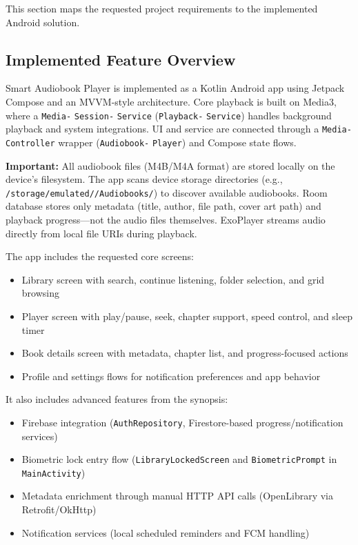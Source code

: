 \documentclass[11pt,a4paper]{article}
\begin{document}
This section maps the requested project requirements to the implemented Android solution.

\subsection{Implemented Feature Overview}

Smart Audiobook Player is implemented as a Kotlin Android app using Jetpack Compose and an MVVM-style architecture. Core playback is built on Media3, where a \texttt{Media-} \texttt{Session-} \texttt{Service} (\texttt{Playback-} \texttt{Service}) handles background playback and system integrations. UI and service are connected through a \texttt{Media-} \texttt{Controller} wrapper (\texttt{Audiobook-} \texttt{Player}) and Compose state flows.

\textbf{Important:} All audiobook files (M4B/M4A format) are stored locally on the device's filesystem. The app scans device storage directories (e.g., \texttt{/storage/\allowbreak emulated//\allowbreak Audiobooks/}) to discover available audiobooks. Room database stores only metadata (title, author, file path, cover art path) and playback progress---not the audio files themselves. ExoPlayer streams audio directly from local file URIs during playback.

The app includes the requested core screens:
\begin{itemize}[noitemsep]
    \item Library screen with search, continue listening, folder selection, and grid browsing
    \item Player screen with play/pause, seek, chapter support, speed control, and sleep timer
    \item Book details screen with metadata, chapter list, and progress-focused actions
    \item Profile and settings flows for notification preferences and app behavior
\end{itemize}

It also includes advanced features from the synopsis:
\begin{itemize}[noitemsep]
    \item Firebase integration (\texttt{AuthRepository}, Firestore-based progress/notification services)
    \item Biometric lock entry flow (\texttt{LibraryLockedScreen} and \texttt{BiometricPrompt} in \texttt{MainActivity})
    \item Metadata enrichment through manual HTTP API calls (OpenLibrary via Retrofit/OkHttp)
    \item Notification services (local scheduled reminders and FCM handling)
\end{itemize}
\end{document}
